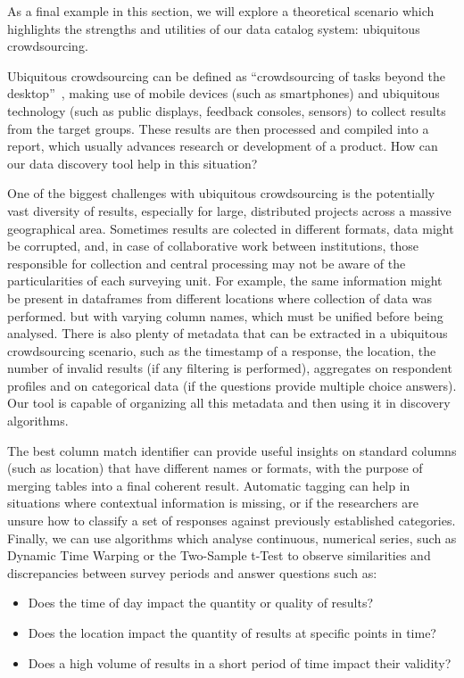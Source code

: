 As a final example in this section, we will explore a theoretical scenario which highlights the strengths and utilities of
our data catalog system: ubiquitous crowdsourcing.

Ubiquitous crowdsourcing can be defined as ``crowdsourcing of tasks beyond the desktop''~\cite{ubiquitousCrowdsourcing},
making use of mobile devices (such as smartphones) and ubiquitous technology (such as public displays, feedback consoles,
sensors) to collect results from the target groups.
These results are then processed and compiled into a report, which usually advances research or development of a product.
How can our data discovery tool help in this situation?

One of the biggest challenges with ubiquitous crowdsourcing is the potentially vast diversity of results, especially for large,
distributed projects across a massive geographical area.
Sometimes results are colected in different formats, data might be corrupted, and, in case of collaborative work between
institutions, those responsible for collection and central processing may not be aware of the particularities of each surveying
unit.
For example, the same information might be present in dataframes from different locations where collection of data was performed.
but with varying column names, which must be unified before being analysed.
There is also plenty of metadata that can be extracted in a ubiquitous crowdsourcing scenario, such as the timestamp of a
response, the location, the number of invalid results (if any filtering is performed), aggregates on respondent profiles and
on categorical data (if the questions provide multiple choice answers).
Our tool is capable of organizing all this metadata and then using it in discovery algorithms.

The best column match identifier can provide useful insights on standard columns (such as location) that have different names
or formats, with the purpose of merging tables into a final coherent result.
Automatic tagging can help in situations where contextual information is missing, or if the researchers are unsure how to classify
a set of responses against previously established categories.
Finally, we can use algorithms which analyse continuous, numerical series, such as Dynamic Time Warping or the Two-Sample t-Test
to observe similarities and discrepancies between survey periods and answer questions such as:

\begin{itemize}
    \item Does the time of day impact the quantity or quality of results?
    \item Does the location impact the quantity of results at specific points in time?
    \item Does a high volume of results in a short period of time impact their validity?
\end{itemize}

